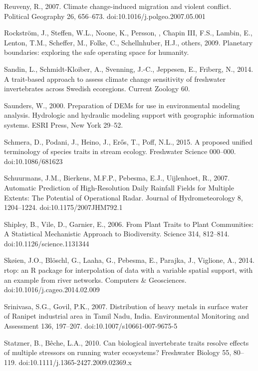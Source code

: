 \begin{thebibliography}
\bibitem{} \hangindent=1cm Reuveny, R., 2007. Climate change-induced migration and violent conflict. Political Geography 26, 656–673. doi:10.1016/j.polgeo.2007.05.001

\bibitem{} \hangindent=1cm Rockström, J., Steffen, W.L., Noone, K., Persson, \AAsa, Chapin III, F.S., Lambin, E., Lenton, T.M., Scheffer, M., Folke, C., Schellnhuber, H.J., others, 2009. Planetary boundaries: exploring the safe operating space for humanity.

\bibitem{} \hangindent=1cm Sandin, L., Schmidt-Kloiber, A., Svenning, J.-C., Jeppesen, E., Friberg, N., 2014. A trait-based approach to assess climate change sensitivity of freshwater invertebrates across Swedish ecoregions. Current Zoology 60.

\bibitem{} \hangindent=1cm Saunders, W., 2000. Preparation of DEMs for use in environmental modeling analysis. Hydrologic and hydraulic modeling support with geographic information systems. ESRI Press, New York 29–52.

\bibitem{} \hangindent=1cm Schmera, D., Podani, J., Heino, J., Erős, T., Poff, N.L., 2015. A proposed unified terminology of species traits in stream ecology. Freshwater Science 000–000. doi:10.1086/681623

\bibitem{} \hangindent=1cm Schuurmans, J.M., Bierkens, M.F.P., Pebesma, E.J., Uijlenhoet, R., 2007. Automatic Prediction of High-Resolution Daily Rainfall Fields for Multiple Extents: The Potential of Operational Radar. Journal of Hydrometeorology 8, 1204–1224. doi:10.1175/2007JHM792.1

\bibitem{} \hangindent=1cm Shipley, B., Vile, D., Garnier, E., 2006. From Plant Traits to Plant Communities: A Statistical Mechanistic Approach to Biodiversity. Science 314, 812–814. doi:10.1126/science.1131344

\bibitem{} \hangindent=1cm Skøien, J.O., Blöschl, G., Laaha, G., Pebesma, E., Parajka, J., Viglione, A., 2014. rtop: an R package for interpolation of data with a variable spatial support, with an example from river networks. Computers & Geosciences. doi:10.1016/j.cageo.2014.02.009

\bibitem{} \hangindent=1cm Srinivasa, S.G., Govil, P.K., 2007. Distribution of heavy metals in surface water of Ranipet industrial area in Tamil Nadu, India. Environmental Monitoring and Assessment 136, 197–207. doi:10.1007/s10661-007-9675-5

\bibitem{} \hangindent=1cm Statzner, B., Bêche, L.A., 2010. Can biological invertebrate traits resolve effects of multiple stressors on running water ecosystems? Freshwater Biology 55, 80–119. doi:10.1111/j.1365-2427.2009.02369.x


\end{thebibliography}
